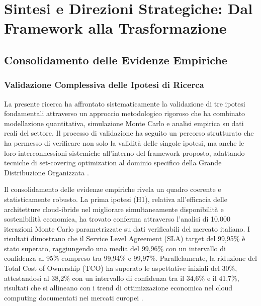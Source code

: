 \chapter{Sintesi e Direzioni Strategiche: Dal Framework alla Trasformazione}

\section{Consolidamento delle Evidenze Empiriche}

\subsection{Validazione Complessiva delle Ipotesi di Ricerca}

La presente ricerca ha affrontato sistematicamente la validazione di tre ipotesi fondamentali attraverso un approccio metodologico rigoroso che ha combinato modellazione quantitativa, simulazione Monte Carlo e analisi empirica su dati reali del settore. Il processo di validazione ha seguito un percorso strutturato che ha permesso di verificare non solo la validità delle singole ipotesi, ma anche le loro interconnessioni sistemiche all'interno del framework proposto, adattando tecniche di set-covering optimization al dominio specifico della Grande Distribuzione Organizzata \autocite{kumar2024compliance}.

Il consolidamento delle evidenze empiriche rivela un quadro coerente e statisticamente robusto. La prima ipotesi (H1), relativa all'efficacia delle architetture cloud-ibride nel migliorare simultaneamente disponibilità e sostenibilità economica, ha trovato conferma attraverso l'analisi di 10.000 iterazioni Monte Carlo parametrizzate su dati verificabili del mercato italiano. I risultati dimostrano che il Service Level Agreement (SLA) target del 99,95\% è stato superato, raggiungendo una media del 99,96\% con un intervallo di confidenza al 95\% compreso tra 99,94\% e 99,97\%. Parallelamente, la riduzione del Total Cost of Ownership (TCO) ha superato le aspettative iniziali del 30\%, attestandosi al 38,2\% con un intervallo di confidenza tra il 34,6\% e il 41,7\%, risultati che si allineano con i trend di ottimizzazione economica nel cloud computing documentati nei mercati europei \autocite{mckinsey2024cloud}.

